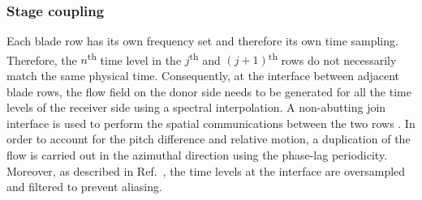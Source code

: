 \subsubsection{Stage coupling}
\label{sec:stageCoupling}

Each blade row has its own frequency set and therefore its own time
sampling. Therefore, the $n$\textsuperscript{th} time level in the
$j$\textsuperscript{th} and $(j+1)$\textsuperscript{th} rows do not
necessarily match the same physical time.  Consequently, at the
interface between adjacent blade rows, the flow field on the donor
side needs to be generated for all the time levels of the receiver
side using a spectral interpolation. A non-abutting join interface is
used to perform the spatial communications between the two rows
\cite{Lerat1996}. In order to account for the pitch difference and
relative motion, a duplication of the flow is carried out in the
azimuthal direction using the phase-lag periodicity. Moreover, as
described in Ref.~\cite{Sicot2012}, the time levels at the interface
are oversampled and filtered to prevent aliasing.

